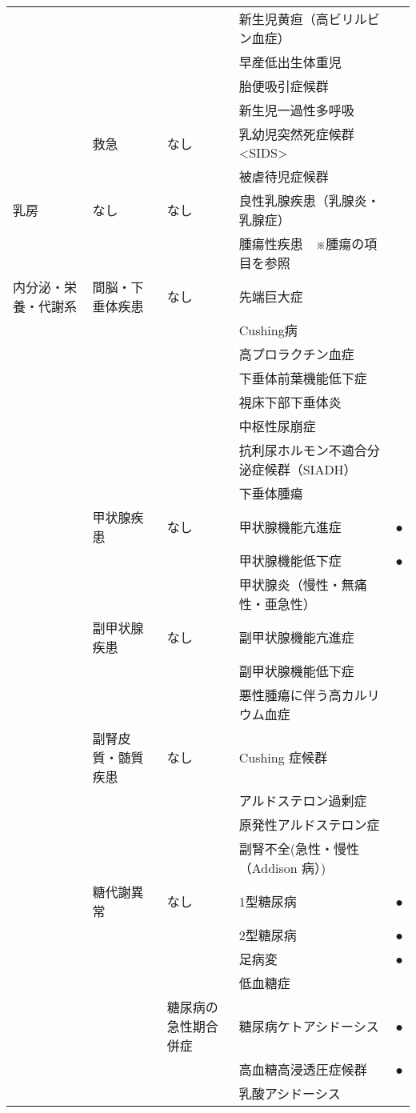 \begin{xltabular}{\linewidth}{XXXXX}
 &  &  & 新生児黄疸（高ビリルビン血症） &  \\
 &  &  & 早産低出生体重児 &  \\
 &  &  & 胎便吸引症候群 &  \\
 &  &  & 新生児一過性多呼吸 &  \\
 & 救急 & なし & 乳幼児突然死症候群 <SIDS> &  \\
 &  &  & 被虐待児症候群 &  \\
乳房 & なし & なし & 良性乳腺疾患（乳腺炎・乳腺症） &  \\
 &  &  & 腫瘍性疾患　※腫瘍の項目を参照 &  \\
内分泌・栄養・代謝系 & 間脳・下垂体疾患 & なし & 先端巨大症 &  \\
 &  &  & Cushing病 &  \\
 &  &  & 高プロラクチン血症 &  \\
 &  &  & 下垂体前葉機能低下症 &  \\
 &  &  & 視床下部下垂体炎 &  \\
 &  &  & 中枢性尿崩症 &  \\
 &  &  & 抗利尿ホルモン不適合分泌症候群（SIADH） &  \\
 &  &  & 下垂体腫瘍 &  \\
 & 甲状腺疾患 & なし & 甲状腺機能亢進症 & ● \\
 &  &  & 甲状腺機能低下症 & ● \\
 &  &  & 甲状腺炎（慢性・無痛性・亜急性） &  \\
 & 副甲状腺疾患 & なし & 副甲状腺機能亢進症 &  \\
 &  &  & 副甲状腺機能低下症 &  \\
 &  &  & 悪性腫瘍に伴う高カルリウム血症 &  \\
 & 副腎皮質・髄質疾患 & なし & Cushing 症候群 &  \\
 &  &  & アルドステロン過剰症 &  \\
 &  &  & 原発性アルドステロン症 &  \\
 &  &  & 副腎不全(急性・慢性（Addison 病）) &  \\
 & 糖代謝異常 & なし & 1型糖尿病 & ● \\
 &  &  & 2型糖尿病 & ● \\
 &  &  & 足病変 & ● \\
 &  &  & 低血糖症 &  \\
 &  & 糖尿病の急性期合併症 & 糖尿病ケトアシドーシス & ● \\
 &  &  & 高血糖高浸透圧症候群 & ● \\
 &  &  & 乳酸アシドーシス &  \\

\end{xltabular}
